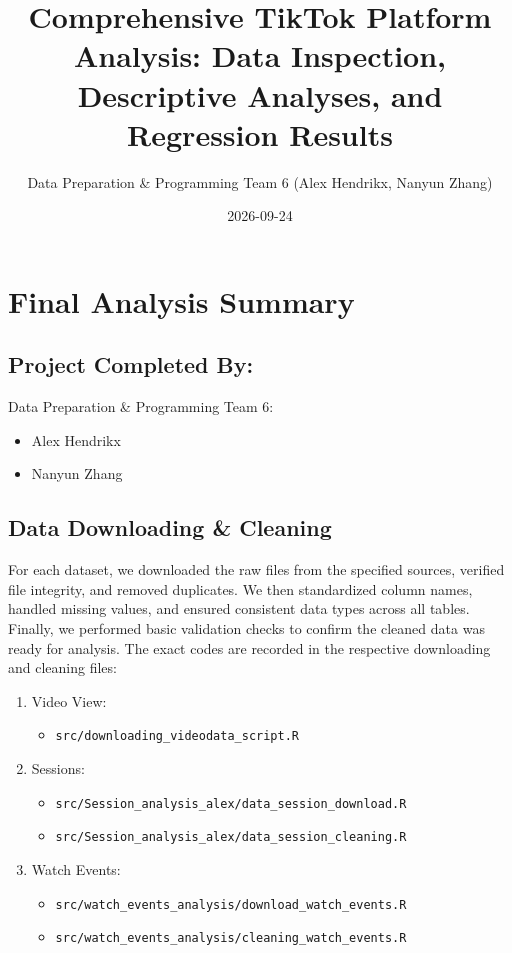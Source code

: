 \documentclass[
  letterpaper,
  DIV=11,
  numbers=noendperiod]{scrartcl}
\title{Comprehensive TikTok Platform Analysis: Data Inspection,
Descriptive Analyses, and Regression Results}
\author{Data Preparation \& Programming Team 6 (Alex Hendrikx, Nanyun
Zhang)}
\date{2026-09-24}
\providecommand{\tightlist}{%
  \setlength{\itemsep}{0pt}\setlength{\parskip}{0pt}}
\renewcommand*\contentsname{Table of contents}
\newcommand\contentsname{Table of contents}
\begin{document}
\maketitle

\renewcommand*\contentsname{Table of contents}
{
\setcounter{tocdepth}{2}
\tableofcontents
}

\section{Final Analysis Summary}\label{final-analysis-summary}

\subsection{Project Completed By:}\label{project-completed-by}

Data Preparation \& Programming Team 6:

\begin{itemize}
\item
  Alex Hendrikx
\item
  Nanyun Zhang
\end{itemize}

\subsection{Data Downloading \&
Cleaning}\label{data-downloading-cleaning}

For each dataset, we downloaded the raw files from the specified
sources, verified file integrity, and removed duplicates. We then
standardized column names, handled missing values, and ensured
consistent data types across all tables. Finally, we performed basic
validation checks to confirm the cleaned data was ready for analysis.
The exact codes are recorded in the respective downloading and cleaning
files:

\begin{enumerate}
\def\labelenumi{\arabic{enumi}.}
\item
  Video View:

  \begin{itemize}
  \tightlist
  \item
    \texttt{src/downloading\_videodata\_script.R}
  \end{itemize}
\item
  Sessions:

  \begin{itemize}
  \item
    \texttt{src/Session\_analysis\_alex/data\_session\_download.R}
  \item
    \texttt{src/Session\_analysis\_alex/data\_session\_cleaning.R}
  \end{itemize}
\item
  Watch Events:

  \begin{itemize}
  \item
    \texttt{src/watch\_events\_analysis/download\_watch\_events.R}
  \item
    \texttt{src/watch\_events\_analysis/cleaning\_watch\_events.R}
  \end{itemize}
\end{enumerate}
\end{document}
